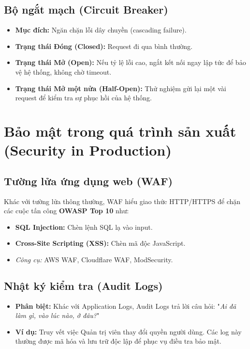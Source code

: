 \documentclass[12pt,a4paper]{article}
\begin{document}
\subsection{Bộ ngắt mạch (Circuit Breaker)}
\begin{itemize}
    \item \textbf{Mục đích:} Ngăn chặn lỗi dây chuyền (cascading failure).
    \item \textbf{Trạng thái Đóng (Closed):} Request đi qua bình thường.
    \item \textbf{Trạng thái Mở (Open):} Nếu tỷ lệ lỗi cao, ngắt kết nối ngay lập tức để bảo vệ hệ thống, không chờ timeout.
    \item \textbf{Trạng thái Mở một nửa (Half-Open):} Thử nghiệm gửi lại một vài request để kiểm tra sự phục hồi của hệ thống.
\end{itemize}

\section{Bảo mật trong quá trình sản xuất (Security in Production)}

\subsection{Tường lửa ứng dụng web (WAF)}
Khác với tường lửa thông thường, WAF hiểu giao thức HTTP/HTTPS để chặn các cuộc tấn công \textbf{OWASP Top 10} như:
\begin{itemize}
    \item \textbf{SQL Injection:} Chèn lệnh SQL lạ vào input.
    \item \textbf{Cross-Site Scripting (XSS):} Chèn mã độc JavaScript.
    \item \textit{Công cụ:} AWS WAF, Cloudflare WAF, ModSecurity.
\end{itemize}

\subsection{Nhật ký kiểm tra (Audit Logs)}
\begin{itemize}
    \item \textbf{Phân biệt:} Khác với Application Logs, Audit Logs trả lời câu hỏi: "\textit{Ai đã làm gì, vào lúc nào, ở đâu?}"
    \item \textbf{Ví dụ:} Truy vết việc Quản trị viên thay đổi quyền người dùng. Các log này thường được mã hóa và lưu trữ độc lập để phục vụ điều tra bảo mật.
\end{itemize}
\end{document}

